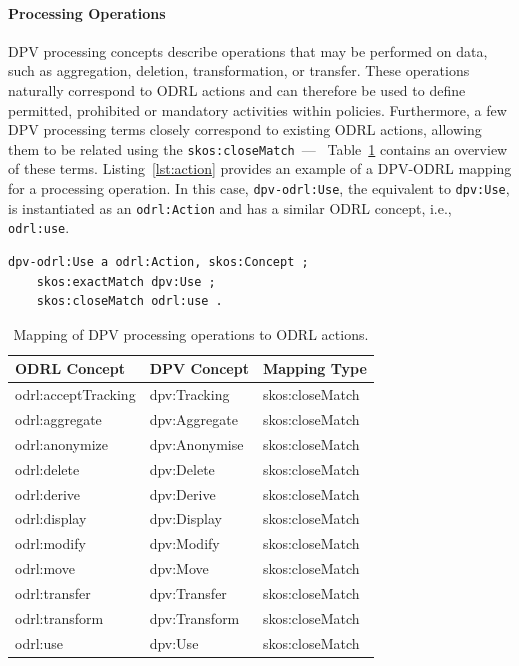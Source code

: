 \paragraph{Processing Operations}

DPV processing concepts describe
operations that may be performed on data,
such as aggregation, deletion, transformation, or transfer.
These operations naturally correspond to ODRL actions and
can therefore be used to define
permitted, prohibited or mandatory activities within policies.
Furthermore, 
a few DPV processing terms closely correspond to existing ODRL actions,
allowing them to be related using the \texttt{skos:closeMatch}~---~%
Table~\ref{tab:processing} contains an overview of these terms.
Listing~\ref{lst:action} provides an example of a
DPV-ODRL mapping for a processing operation.
In this case,
\texttt{dpv-odrl:Use},
the equivalent to \texttt{dpv:Use},
is instantiated as an \texttt{odrl:Action} and
has a similar ODRL concept, i.e., \texttt{odrl:use}.

\begin{scriptsize}
\begin{lstlisting}[language=turtle, caption=DPV-ODRL mapping for the Use concept., label=lst:action]
dpv-odrl:Use a odrl:Action, skos:Concept ;
	skos:exactMatch dpv:Use ;
	skos:closeMatch odrl:use .
\end{lstlisting}
\end{scriptsize}

\begin{table}[ht]
    \centering
    \caption{Mapping of DPV processing operations to ODRL actions.}
    \label{tab:processing}
    \begin{tabular}{lll}
        \toprule
        \textbf{ODRL Concept} & \textbf{DPV Concept} & \textbf{Mapping Type} \\
        \midrule
        odrl:acceptTracking & dpv:Tracking & skos:closeMatch \\
        odrl:aggregate & dpv:Aggregate & skos:closeMatch \\
        odrl:anonymize & dpv:Anonymise & skos:closeMatch \\
        odrl:delete & dpv:Delete & skos:closeMatch \\
        odrl:derive & dpv:Derive & skos:closeMatch \\
        odrl:display & dpv:Display & skos:closeMatch \\
        odrl:modify & dpv:Modify & skos:closeMatch \\
        odrl:move & dpv:Move & skos:closeMatch \\
        odrl:transfer & dpv:Transfer & skos:closeMatch \\
        odrl:transform & dpv:Transform & skos:closeMatch \\
        odrl:use & dpv:Use & skos:closeMatch \\
        \bottomrule
    \end{tabular}
\end{table}

